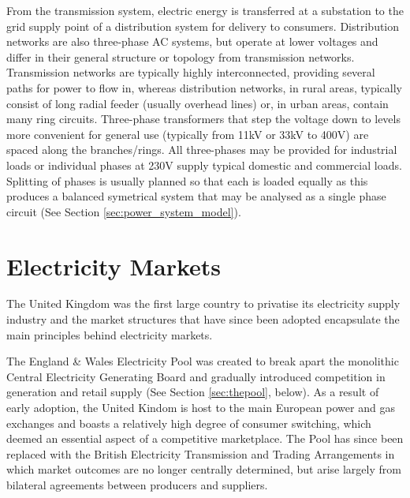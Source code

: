 From the transmission system, electric energy is transferred at a substation to
the grid supply point of a distribution system for delivery to consumers.
Distribution networks are also three-phase AC systems, but operate at lower
voltages and differ in their general structure or topology from transmission
networks.  Transmission networks are typically highly interconnected, providing
several paths for power to flow in, whereas distribution networks, in rural
areas, typically consist of long radial feeder (usually overhead lines) or, in
urban areas, contain many ring circuits.  Three-phase transformers that step the
voltage down to levels more convenient for general use (typically from 11kV or
33kV to 400V) are spaced along the branches/rings.  All three-phases may be
provided for industrial loads or individual phases at 230V supply typical
domestic and commercial loads.  Splitting of phases is usually planned so that
each is loaded equally as this produces a balanced symetrical system that may
be analysed as a single phase circuit (See Section
\ref{sec:power_system_model}).

\section{Electricity Markets}
The United Kingdom was the first large country to privatise its electricity
supply industry and the market structures that have since been adopted
encapsulate the main principles behind electricity markets.

The England \& Wales Electricity Pool was created to break apart the monolithic
Central Electricity Generating Board and gradually introduced
competition in generation and retail supply (See Section \ref{sec:thepool},
below). As a result of early adoption, the United Kindom is host to the main
European power and gas exchanges and boasts a relatively high degree of
consumer switching, which deemed an essential aspect of a competitive
marketplace. The Pool has since been replaced with the British Electricity
Transmission and Trading Arrangements in which market outcomes are no longer
centrally determined, but arise largely from bilateral agreements between
producers and suppliers.

